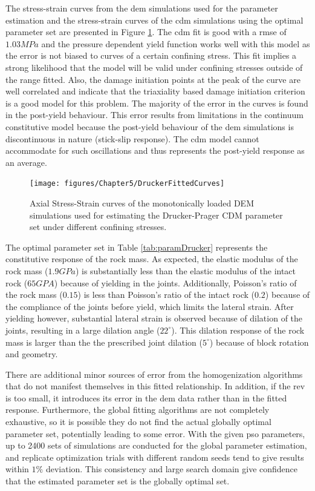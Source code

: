 The stress-strain curves from the \acrshort{dem} simulations used for the parameter estimation and the stress-strain curves of the \acrshort{cdm} simulations using the optimal parameter set are presented in Figure \ref{fig:fitted1}. The \acrshort{cdm} fit is good with a \acrfull{rmse} of $1.03MPa$ and the pressure dependent yield function works well with this model as the error is not biased to curves of a certain confining stress. This fit implies a strong likelihood that the model will be valid under confining stresses outside of the range fitted. Also, the damage initiation points at the peak of the curve are well correlated and indicate that the triaxiality based damage initiation criterion is a good model for this problem. The majority of the error in the curves is found in the post-yield behaviour. This error results from limitations in the continuum constitutive model because the post-yield behaviour of the \acrshort{dem} simulations is discontinuous in nature (stick-slip response). The \acrshort{cdm} model cannot accommodate for such oscillations and thus represents the post-yield response as an average. 

\begin{figure}[!htb]
\begin{center}
\texttt{[image: figures/Chapter5/DruckerFittedCurves]}
\caption{{\label{fig:fitted1} Axial Stress-Strain curves of the monotonically loaded DEM simulations used for estimating the Drucker-Prager CDM parameter set under different confining stresses.%
}}
\end{center}
\end{figure}

The optimal parameter set in Table \ref{tab:paramDrucker} represents the constitutive response of the rock mass. As expected, the elastic modulus of the rock mass ($1.9 GPa$) is substantially less than the elastic modulus of the intact rock ($65 GPA$) because of yielding in the joints. Additionally, Poisson's ratio of the rock mass ($0.15$) is less than Poisson's ratio of the intact rock ($0.2$) because of the compliance of the joints before yield, which limits the lateral strain. After yielding however, substantial lateral strain is observed because of dilation of the joints, resulting in a large dilation angle ($22^\circ$). This dilation response of the rock mass is larger than the the prescribed joint dilation ($5^\circ$) because of block rotation and geometry.

There are additional minor sources of error from the homogenization algorithms that do not manifest themselves in this fitted relationship.  In addition, if the \acrshort{rev} is too small, it introduces its error in the \acrshort{dem} data rather than in the fitted response. Furthermore, the global fitting algorithms are not completely exhaustive, so it is possible they do not find the actual globally optimal parameter set, potentially leading to some error. With the given \acrshort{pso} parameters, up to 2400 sets of simulations are conducted for the global parameter estimation, and replicate optimization trials with different random seeds tend to give results within $1\%$ deviation. This consistency and large search domain give confidence that the estimated parameter set is the globally optimal set. 

